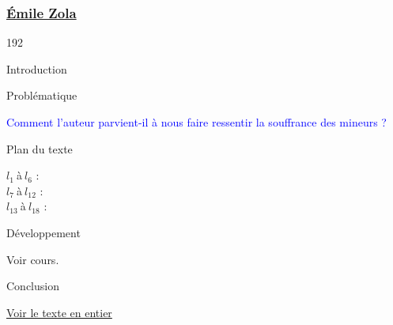 \documentclass[12pt,a4paper]{article}
\begin{document}
				\subsubsection{\href{.extra/Bio/Zola.pdf}{\'Emile Zola}}
\begin{dingautolist}{192}

\item Introduction \par
\item Probl\'ematique \par
	\textcolor{blue}{Comment l’auteur parvient-il à nous faire ressentir la souffrance des mineurs ?}
\item Plan du texte \par
	$l_{1}~$\`a$~l_{6}$ :   		\\
    $l_{7}~$\`a$~l_{12}$ :  		\\
    $l_{13}~$\`a$~l_{18}$ : 


\item D\'eveloppement \par
        Voir cours.

\item Conclusion \par


\end{dingautolist}
\href{.extra/Textes/Germinal_Texte_2_12.pdf}{Voir le texte en entier}
\end{document}
